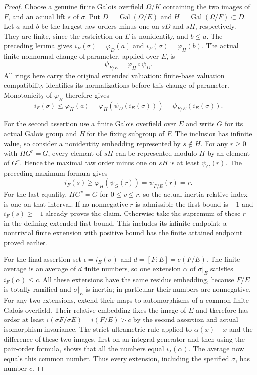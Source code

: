 \begin{proof}
Choose a genuine finite Galois overfield $\Omega/K$ containing the
two images of $F$, and an actual lift $s$ of $\sigma$.
Put $D=\operatorname{Gal}(\Omega/E)$ and
$H=\operatorname{Gal}(\Omega/F)\subset D$.
Let $a$ and $b$ be the largest raw orders minus one on $sD$ and
$sH$, respectively. They are finite, since the restriction on $E$
is nonidentity, and $b\leq a$.
The preceding lemma gives
$i_E(\sigma)=\varphi_D(a)$ and
$i_F(\sigma)=\varphi_H(b)$. The actual finite nonnormal change
of parameter, applied over $E$, is
\[
 \psi_{F/E}=\varphi_H\circ\psi_D.
\]
All rings here carry the original extended valuation: finite-base
valuation compatibility identifies its normalizations before this
change of parameter. Monotonicity of $\varphi_H$ therefore gives
\[
 i_F(\sigma)\leq\varphi_H(a)
 =\varphi_H(\psi_D(i_E(\sigma)))
 =\psi_{F/E}(i_E(\sigma)).
\]

For the second assertion use a finite Galois overfield over $E$ and
write $G$ for its actual Galois group and $H$ for the fixing subgroup
of $F$. The inclusion has infinite value, so consider a nonidentity
embedding represented by $s\notin H$. For any $r\geq0$ with
$HG^r=G$, every element of $sH$ can be represented modulo $H$
by an element of $G^r$. Hence the maximal raw order minus one on
$sH$ is at least $\psi_G(r)$. The preceding maximum formula gives
\[
 i_F(s)\geq\varphi_H(\psi_G(r))=\psi_{F/E}(r)=r.
\]
For the last equality, $HG^v=G$ for $0\leq v\leq r$, so the
actual inertia-relative index is one on that interval.
If no nonnegative $r$ is admissible the first bound is $-1$ and
$i_F(s)\geq-1$ already proves the claim. Otherwise take the supremum
of these $r$ in the defining extended first bound. This includes
its infinite endpoint; a nontrivial finite extension with positive
bound has the finite attained endpoint proved earlier.

For the final assertion set $c=i_E(\sigma)$ and
$d=[F:E]=e(F/E)$. The finite average is an average of $d$ finite
numbers, so one extension $\alpha$ of $\sigma|_E$ satisfies
$i_F(\alpha)\leq c$. All these extensions have the same residue
embedding, because $F/E$ is totally ramified and $\sigma|_E$ is
inertia; in particular their numbers are nonnegative.
For any two extensions, extend their maps to automorphisms of a
common finite Galois overfield. Their relative embedding fixes the
image of $E$ and therefore has order at least
$i(\sigma F/\sigma E)=i(F/E)>c$ by the second assertion and actual
isomorphism invariance. The strict ultrametric rule applied to
$\alpha(x)-x$ and the difference of these two images, first on an
integral generator and then using the pair-order formula, shows
that all the numbers equal $i_F(\alpha)$.
The average now equals this common number. Thus every extension,
including the specified $\sigma$, has number $c$.
\end{proof}

